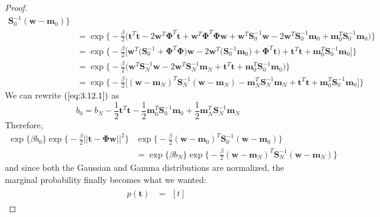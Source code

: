 \begin{proof}
\begin{align*}
             \mathbf{S}_0^{-1}(\mathbf{w} - \mathbf{m}_0)
         \bigg\} \\
        &= \exp\bigg\{-\frac{\beta}{2}\big(
        \mathbf{t}^T\mathbf{t} 
        - 2\mathbf{w}^T \mathbf{\Phi}^T \mathbf{t}
        + \mathbf{w}^T\mathbf{\Phi}^T\mathbf{\Phi}\mathbf{w}
        + \mathbf{w}^T\mathbf{S}_0^{-1}\mathbf{w}
        - 2 \mathbf{w}^T\mathbf{S}_0^{-1}\mathbf{m}_0
        + \mathbf{m}_0^T\mathbf{S}_0^{-1}\mathbf{m}_0\big)\bigg\} \\
        &= \exp\bigg\{-\frac{\beta}{2}\big[
        \mathbf{w}^T\big(\mathbf{S}_0^{-1} 
            + \mathbf{\Phi}^T\mathbf{\Phi}\big)\mathbf{w}
        - 2\mathbf{w}^T\big(\mathbf{S}_0^{-1}\mathbf{m}_0\big)
            + \mathbf{\Phi}^T\mathbf{t}\big) 
        + \mathbf{t}^T\mathbf{t}
        + \mathbf{m}_0^T\mathbf{S}_0^{-1}\mathbf{m}_0\big]\bigg\} \\
        &= \exp\bigg\{-\frac{\beta}{2}\big(
        \mathbf{w}^T\mathbf{S}_N^{-1}\mathbf{w} 
        - 2\mathbf{w}^T\mathbf{S}_N^{-1}\mathbf{m}_N
        + \mathbf{t}^T\mathbf{t}
        + \mathbf{m}_0^T\mathbf{S}_0^{-1}\mathbf{m}_0\big)\bigg\} \\
        &= \exp\bigg\{-\frac{\beta}{2}\big[
        (\mathbf{w} - \mathbf{m}_N)^T\mathbf{S}_N^{-1}(\mathbf{w} - \mathbf{m}_N)
        -\mathbf{m}_N^T\mathbf{S}_N^{-1}\mathbf{m}_N
        + \mathbf{t}^T\mathbf{t}
        + \mathbf{m}_0^T\mathbf{S}_0^{-1}\mathbf{m}_0\big]\bigg\}
    \end{align*}
    We can rewrite $(\ref{eq:3.12.1})$ as
    \[
        b_0 = b_N - \frac{1}{2} \mathbf{t}^T\mathbf{t} 
        - \frac{1}{2} \mathbf{m}_0^T\mathbf{S}_0^{-1}\mathbf{m}_0 
        + \frac{1}{2} \mathbf{m}_N^T\mathbf{S}_N^{-1}\mathbf{m}_N
    \]
    Therefore, 
    \begin{align*}
        \exp\{\beta b_0\}
         \exp\bigg\{-\frac{\beta}{2} ||\mathbf{t} - \mathbf{\Phi}\mathbf{w}||^2\bigg\}
         &\exp\bigg\{-\frac{\beta}{2}(\mathbf{w} - \mathbf{m}_0)^T
             \mathbf{S}_0^{-1}(\mathbf{w} - \mathbf{m}_0)
         \bigg\} \\
         &= \exp\{\beta b_N\}\exp\bigg\{-\frac{\beta}{2} 
            (\mathbf{w} - \mathbf{m}_N)^T\mathbf{S}_N^{-1}(\mathbf{w} - \mathbf{m}_N)\bigg\}
    \end{align*}
    and since both the Gaussian and Gamma distributions
    are normalized, the marginal probability finally becomes
    what we wanted:
    \begin{align*}
        p(\mathbf{t}) 
        &= \begin{aligned}[t]

\end{aligned}
\end{align*}
\end{proof}

